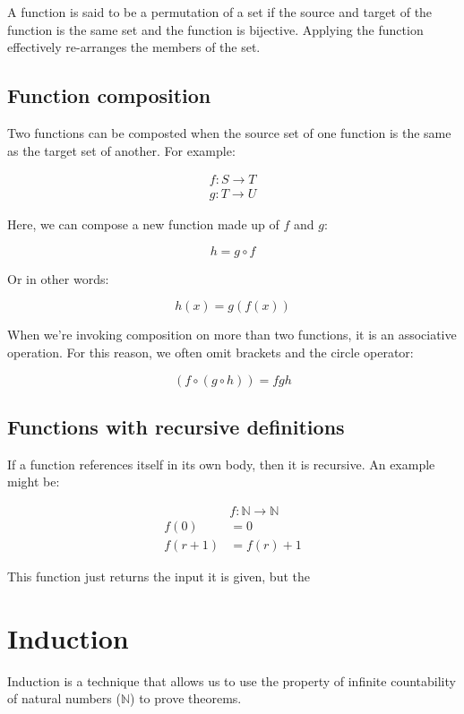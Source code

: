 A function is said to be a permutation of a set if the source and target of the
function is the same set and the function is bijective. Applying the function
effectively re-arranges the members of the set.

\subsection{Function composition}

Two functions can be composted when the source set of one function is the same
as the target set of another. For example:

\[
	\begin{split}
		f:S \rightarrow T\\
		g:T \rightarrow U
	\end{split}
\]

Here, we can compose a new function made up of $f$ and $g$:

\[
	h = g \circ f
\]

Or in other words:

\[
	h(x) = g(f(x))
\]

When we're invoking composition on more than two functions, it is an associative
operation. For this reason, we often omit brackets and the circle operator:

\[
	(f \circ (g \circ h)) = fgh
\]

\subsection*{Functions with recursive definitions}

If a function references itself in its own body, then it is recursive. An
example might be:

\[
	\begin{split}
		&f:\mathbb{N} \rightarrow \mathbb{N}\\
		f(0) &= 0\\
		f(r + 1) &= f(r) + 1
	\end{split}
\]

This function just returns the input it is given, but the 

\section{Induction}

Induction is a technique that allows us to use the property of infinite
countability of natural numbers ($\mathbb{N}$) to prove theorems.

